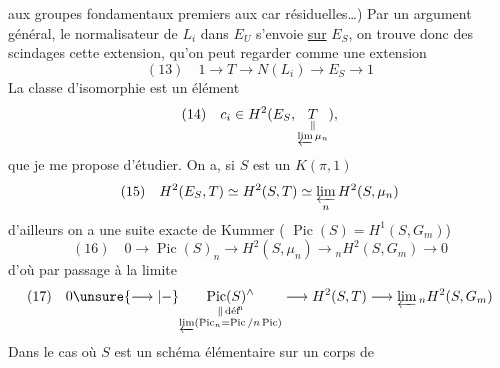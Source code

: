 aux groupes fondamentaux premiers aux car résiduelles\dots) Par un argument général, le normalisateur de $L_i$ dans $E_U$ s'envoie \uline{sur} $E_S$, on trouve donc des scindages  cette extension, qu'on peut regarder comme une extension
\[
(13)\quad 1\longrightarrow T\longrightarrow N(L_i)\longrightarrow E_S\longrightarrow1
\]
La classe d'isomorphie est un élément 
\[
(14)\quad c_i\in H^2(E_S,\underset{\substack{\Vert\\\varprojlim\mu_n}}{T}),
\]
que je me propose d'étudier. On a, si $S$ est un $K(\pi,1)$
\[
(15)\quad H^2(E_S,T)\simeq H^2(S,T)\simeq\varprojlim_n H^2(S,\mu_n)
\]
d'ailleurs on a une suite exacte de Kummer ( $\operatorname{Pic}(S)=H^1(S,G_m)$)
\[
(16)\quad 0\longrightarrow\operatorname{Pic}(S)_n\longrightarrow H^2(S,\mu_n)\longrightarrow {}_nH^2(S,G_m)\longrightarrow0
\]
d'où par passage à la limite
\[
(17)\quad 0\unsure{\longrightarrow|-}
\underset{\substack{\Vert\,\text{déf}\!^{\mathrm n}\\\varprojlim(\operatorname{Pic}_n=\operatorname{Pic}/n\operatorname{Pic})}}{\operatorname{Pic}(S)^\wedge}
\longrightarrow H^2(S,T)\longrightarrow\varprojlim {}_nH^2(S,G_m)
\]
Dans le cas où $S$ est un schéma élémentaire sur un corps de  
